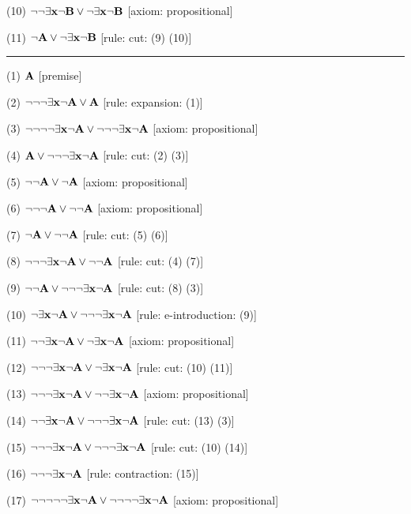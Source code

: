 \item{(10)} $\neg \neg \exists {\bf x} \neg {\bf B} \lor \neg \exists {\bf x} \neg {\bf B}$ \hfill [axiom: propositional]
\item{(11)} $\neg {\bf A} \lor \neg \exists {\bf x} \neg {\bf B}$ \hfill [rule: cut: (9) (10)]
\medskip
\hrule
\medskip
\item{(1)} ${\bf A}$ \hfill [premise]
\item{(2)} $\neg \neg \neg \exists {\bf x} \neg {\bf A} \lor {\bf A}$ \hfill [rule: expansion: (1)]
\item{(3)} $\neg \neg \neg \neg \exists {\bf x} \neg {\bf A} \lor \neg \neg \neg \exists {\bf x} \neg {\bf A}$ \hfill [axiom: propositional]
\item{(4)} ${\bf A} \lor \neg \neg \neg \exists {\bf x} \neg {\bf A}$ \hfill [rule: cut: (2) (3)]
\item{(5)} $\neg \neg {\bf A} \lor \neg {\bf A}$ \hfill [axiom: propositional]
\item{(6)} $\neg \neg \neg {\bf A} \lor \neg \neg {\bf A}$ \hfill [axiom: propositional]
\item{(7)} $\neg {\bf A} \lor \neg \neg {\bf A}$ \hfill [rule: cut: (5) (6)]
\item{(8)} $\neg \neg \neg \exists {\bf x} \neg {\bf A} \lor \neg \neg {\bf A}$ \hfill [rule: cut: (4) (7)]
\item{(9)} $\neg \neg {\bf A} \lor \neg \neg \neg \exists {\bf x} \neg {\bf A}$ \hfill [rule: cut: (8) (3)]
\item{(10)} $\neg \exists {\bf x} \neg {\bf A} \lor \neg \neg \neg \exists {\bf x} \neg {\bf A}$ \hfill [rule: e-introduction: (9)]
\item{(11)} $\neg \neg \exists {\bf x} \neg {\bf A} \lor \neg \exists {\bf x} \neg {\bf A}$ \hfill [axiom: propositional]
\item{(12)} $\neg \neg \neg \exists {\bf x} \neg {\bf A} \lor \neg \exists {\bf x} \neg {\bf A}$ \hfill [rule: cut: (10) (11)]
\item{(13)} $\neg \neg \neg \exists {\bf x} \neg {\bf A} \lor \neg \neg \exists {\bf x} \neg {\bf A}$ \hfill [axiom: propositional]
\item{(14)} $\neg \neg \exists {\bf x} \neg {\bf A} \lor \neg \neg \neg \exists {\bf x} \neg {\bf A}$ \hfill [rule: cut: (13) (3)]
\item{(15)} $\neg \neg \neg \exists {\bf x} \neg {\bf A} \lor \neg \neg \neg \exists {\bf x} \neg {\bf A}$ \hfill [rule: cut: (10) (14)]
\item{(16)} $\neg \neg \neg \exists {\bf x} \neg {\bf A}$ \hfill [rule: contraction: (15)]
\item{(17)} $\neg \neg \neg \neg \neg \exists {\bf x} \neg {\bf A} \lor \neg \neg \neg \neg \exists {\bf x} \neg {\bf A}$ \hfill [axiom: propositional]
